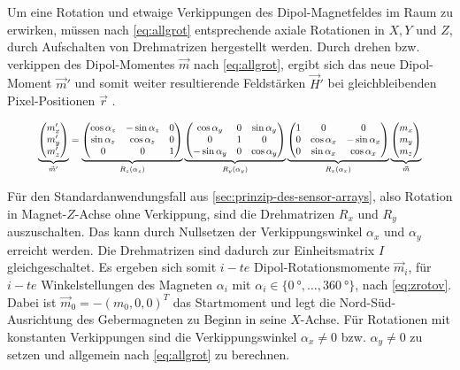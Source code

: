 \clearpage


Um eine Rotation und etwaige Verkippungen des Dipol-Magnetfeldes im Raum zu erwirken, müssen nach \autoref{eq:allgrot} entsprechende axiale Rotationen in $X,Y$ und $Z$, durch Aufschalten von Drehmatrizen hergestellt werden. Durch drehen bzw. verkippen des Dipol-Momentes $\vec{m}$ nach \autoref{eq:allgrot}, ergibt sich das neue Dipol-Moment $\vec{m}'$ und somit weiter resultierende Feldstärken $\vec{H}'$ bei gleichbleibenden Pixel-Positionen $\vec{r}$ \cite{Schuethe2019}.


\begin{equation}\label{eq:allgrot}
\resizebox{.9\linewidth}{!}{$%
	\underbrace{
		\begin{pmatrix}
			 m_x' \\
			 m_y' \\
			 m_z' 
		\end{pmatrix}
	}_{\vec{m}'}  =
	\underbrace{
		\begin{pmatrix}
			\cos\alpha_z & -\sin\alpha_z & 0 \\
			\sin\alpha_z &  \cos\alpha_z & 0 \\
			0			 & 0			 & 1
		\end{pmatrix}
	}_{R_z(\alpha_z)}
	\underbrace{
		\begin{pmatrix}
			\cos\alpha_y  & 0 & \sin\alpha_y \\
			0 		      & 1 & 0 \\
			-\sin\alpha_y & 0 & \cos\alpha_y
		\end{pmatrix}
	}_{R_y(\alpha_y)}
	\underbrace{
		\begin{pmatrix}
			1 & 0 			 & 0 \\
			0 & \cos\alpha_x & -\sin\alpha_x \\
			0 & \sin\alpha_x &  \cos\alpha_x 
		\end{pmatrix}
	}_{R_x(\alpha_x)}
	\underbrace{
		\begin{pmatrix}
			m_x \\
			m_y \\
			m_z
		\end{pmatrix}
	}_{\vec{m}}$%
}
\end{equation}


Für den Standardanwendungsfall aus \autoref{sec:prinzip-des-sensor-arrays}, also Rotation in Magnet-$Z$-Achse ohne Verkippung, sind die Drehmatrizen $R_x$ und $R_y$ auszuschalten. Das kann durch Nullsetzen der Verkippungswinkel $\alpha_x$ und $\alpha_y$ erreicht werden. Die Drehmatrizen sind dadurch zur Einheitsmatrix $I$ gleichgeschaltet. Es ergeben sich somit $i-te$ Dipol-Rotationsmomente $\vec{m}_i$, für $i-te$ Winkelstellungen des Magneten $\alpha_i$ mit $\alpha_i\in\{\SI{0}{\degree},\ldots,\SI{360}{\degree}\}$, nach \autoref{eq:zrotov}. Dabei ist $\vec{m}_0 = -(m_0,0,0)^T$ das Startmoment und legt die Nord-Süd-Ausrichtung des Gebermagneten zu Beginn in seine $X$-Achse. Für Rotationen mit konstanten Verkippungen sind die Verkippungswinkel $\alpha_x \ne 0$ bzw. $\alpha_y \ne 0$ zu setzen und allgemein nach \autoref{eq:allgrot} zu berechnen. 


